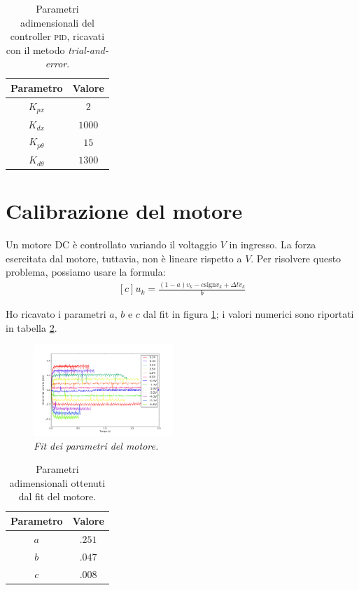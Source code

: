 \begin{table}[H]
  \centering
  \begin{tabular}[t]{cc}
    \toprule
    Parametro &Valore\\
    \midrule
    $K_{px}$ & $2$ \\
    $K_{dx}$ & $1000$ \\
    $K_{p\theta} $ & $15$   \\
    $K_{d\theta}$ & $1300$ \\
    \bottomrule
  \end{tabular}
  \caption{
    Parametri adimensionali del controller \textsc{pid}, ricavati con il metodo \emph{trial-and-error}.
  }
  \label{tab:coefficienti-pid}
\end{table}

\section{Calibrazione del motore}\label{sec:calibrazione-motore}
Un motore DC è controllato variando il voltaggio $V$ in ingresso. La forza esercitata dal motore, tuttavia, non è
lineare rispetto a $V$. Per risolvere questo problema, possiamo usare la formula\cite{dcControl}:
  \begin{equation}
    \begin{aligned}[c]
      u_k = \frac {(1-a)v_k -c \text{sign} v_k + \Delta t \dot v_k} {b}
    \end{aligned}
    \label{eq:motore}
  \end{equation}

Ho ricavato i parametri $a$, $b$ e $c$ dal fit in figura \ref{fig:fit}; i valori numerici sono riportati in tabella \ref{tab:fit}.

\begin{figure}[h]
  \includegraphics[width=0.47\textwidth]{../assets/fit.png} %
  \caption{\emph{Fit dei parametri del motore.}}
  \label{fig:fit}
\end{figure}

\begin{table}[H]
  \centering
  \begin{tabular}[t]{cc}
    \toprule
    Parametro &Valore\\
    \midrule
    $a$ & $.251$ \\
    $b$ & $.047$ \\
    $c$ & $.008$ \\
    \bottomrule
  \end{tabular}
  \caption{
    Parametri adimensionali ottenuti dal fit del motore.
  }
  \label{tab:fit}
\end{table}

